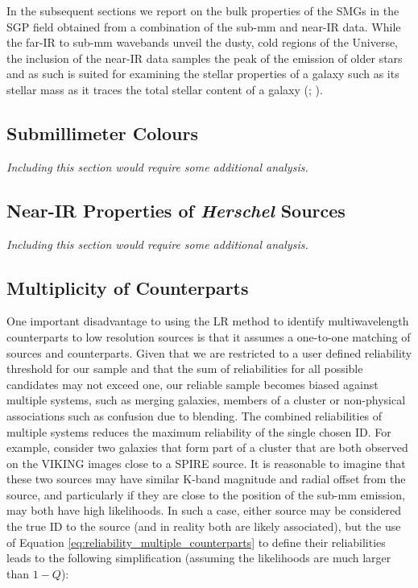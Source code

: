 In the subsequent sections we report on the bulk properties of the SMGs in the SGP field obtained from a combination of the sub-mm and near-IR data. While the far-IR to sub-mm wavebands unveil the dusty, cold regions of the Universe, the inclusion of the near-IR data samples the peak of the emission of older stars and as such is suited for examining the stellar properties of a galaxy such as its stellar mass as it traces the total stellar content of a galaxy (\citealt{Cole_2001}; \citealt{Bell_2003}).

\subsection{Submillimeter Colours}

\textit{
Including this section would require some additional analysis.
}

\subsection{Near-IR Properties of \textit{Herschel} Sources}

\textit{
Including this section would require some additional analysis.
}

\subsection{Multiplicity of Counterparts}
\label{sec:multiplicity}
One important disadvantage to using the LR method to identify multiwavelength counterparts to low resolution sources is that it assumes a one-to-one matching of sources and counterparts. Given that we are restricted to a user defined reliability threshold for our sample and that the sum of reliabilities for all possible candidates may not exceed one, our reliable sample becomes biased against multiple systems, such as merging galaxies, members of a cluster or non-physical associations such as confusion due to blending. The combined reliabilities of multiple systems reduces the maximum reliability of the single chosen ID. For example, consider two galaxies that form part of a cluster that are both observed on the VIKING images close to a SPIRE source. It is reasonable to imagine that these two sources may have similar K-band magnitude and radial offset from the source, and particularly if they are close to the position of the sub-mm emission, may both have high likelihoods. In such a case, either source may be considered the true ID to the source (and in reality both are likely associated), but the use of Equation \ref{eq:reliability_multiple_counterparts} to define their reliabilities leads to the following simplification (assuming the likelihoods are much larger than $1-Q$):

